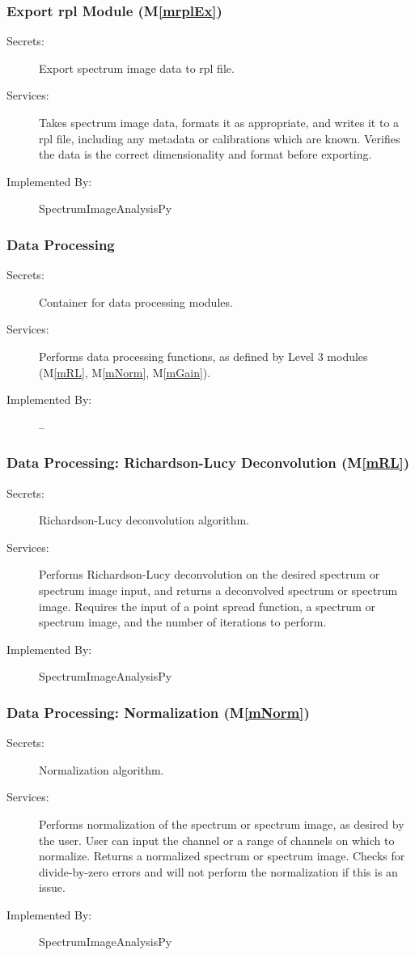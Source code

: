 \documentclass[12pt, titlepage]{article}
\newcommand{\mref}[1]{M\ref{#1}}
\newcommand{\progname}{SpectrumImageAnalysisPy}
\begin{document}
\subsubsection{Export rpl Module (\mref{mrplEx})}
\label{sssec:ExportRPL}
\begin{description}
	\item[Secrets:]Export spectrum image data to rpl file.
	\item[Services:]Takes spectrum image data, formats it as appropriate, and
writes it to a rpl file, including any metadata or calibrations which are known.
Verifies the data is the correct dimensionality and format before exporting.
	\item[Implemented By:] \progname
\end{description}

\subsubsection{Data Processing}
\label{sssec:DataProc}
\begin{description}
	\item[Secrets:]Container for data processing modules.
	\item[Services:]Performs data processing functions, as defined by Level 3
modules (\mref{mRL}, \mref{mNorm}, \mref{mGain}).
	\item[Implemented By:] --
\end{description}

\subsubsection{Data Processing: Richardson-Lucy Deconvolution (\mref{mRL})}
\label{sssec:RL}
\begin{description}
	\item[Secrets:]Richardson-Lucy deconvolution algorithm.
	\item[Services:]Performs Richardson-Lucy deconvolution on the desired spectrum
or spectrum image input, and returns a deconvolved spectrum or spectrum image.
Requires the input of a point spread function, a spectrum or spectrum image, and
the number of iterations to perform.
	\item[Implemented By:] \progname
\end{description}

\subsubsection{Data Processing: Normalization (\mref{mNorm})}
\label{sssec:Norm}
\begin{description}
	\item[Secrets:]Normalization algorithm.
	\item[Services:]Performs normalization of the spectrum or spectrum image, as
desired by the user. User can input the channel or a range of channels on which
to normalize. Returns a normalized spectrum or spectrum image. Checks for
divide-by-zero errors and will not perform the normalization if this is an
issue.
	\item[Implemented By:] \progname
\end{description}
\end{document}

